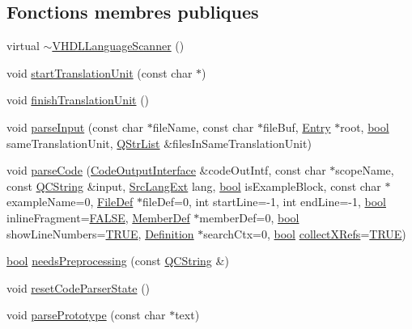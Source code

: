 \subsection*{Fonctions membres publiques}
\begin{DoxyCompactItemize}
\item 
virtual \hyperlink{class_v_h_d_l_language_scanner_a9d7b0728dbc101161107fe0785ae460b}{$\sim$\+V\+H\+D\+L\+Language\+Scanner} ()
\item 
void \hyperlink{class_v_h_d_l_language_scanner_a57e38f82bcb0ab8af7d6dabe131ad394}{start\+Translation\+Unit} (const char $\ast$)
\item 
void \hyperlink{class_v_h_d_l_language_scanner_a1c08cc94a1cd79fdaf8a102935089445}{finish\+Translation\+Unit} ()
\item 
void \hyperlink{class_v_h_d_l_language_scanner_a604cae09257525fbca32c10ffeb6e961}{parse\+Input} (const char $\ast$file\+Name, const char $\ast$file\+Buf, \hyperlink{class_entry}{Entry} $\ast$root, \hyperlink{qglobal_8h_a1062901a7428fdd9c7f180f5e01ea056}{bool} same\+Translation\+Unit, \hyperlink{class_q_str_list}{Q\+Str\+List} \&files\+In\+Same\+Translation\+Unit)
\item 
void \hyperlink{class_v_h_d_l_language_scanner_a50e725c43fa209d4caad04c214bbb1f2}{parse\+Code} (\hyperlink{class_code_output_interface}{Code\+Output\+Interface} \&code\+Out\+Intf, const char $\ast$scope\+Name, const \hyperlink{class_q_c_string}{Q\+C\+String} \&input, \hyperlink{types_8h_a9974623ce72fc23df5d64426b9178bf2}{Src\+Lang\+Ext} lang, \hyperlink{qglobal_8h_a1062901a7428fdd9c7f180f5e01ea056}{bool} is\+Example\+Block, const char $\ast$example\+Name=0, \hyperlink{class_file_def}{File\+Def} $\ast$file\+Def=0, int start\+Line=-\/1, int end\+Line=-\/1, \hyperlink{qglobal_8h_a1062901a7428fdd9c7f180f5e01ea056}{bool} inline\+Fragment=\hyperlink{qglobal_8h_a10e004b6916e78ff4ea8379be80b80cc}{F\+A\+L\+S\+E}, \hyperlink{class_member_def}{Member\+Def} $\ast$member\+Def=0, \hyperlink{qglobal_8h_a1062901a7428fdd9c7f180f5e01ea056}{bool} show\+Line\+Numbers=\hyperlink{qglobal_8h_a04a6422a52070f0dc478693da640242b}{T\+R\+U\+E}, \hyperlink{class_definition}{Definition} $\ast$search\+Ctx=0, \hyperlink{qglobal_8h_a1062901a7428fdd9c7f180f5e01ea056}{bool} \hyperlink{tclscanner_8cpp_ac23b94d6976d5bb0c9f1885c5a2e7a53}{collect\+X\+Refs}=\hyperlink{qglobal_8h_a04a6422a52070f0dc478693da640242b}{T\+R\+U\+E})
\item 
\hyperlink{qglobal_8h_a1062901a7428fdd9c7f180f5e01ea056}{bool} \hyperlink{class_v_h_d_l_language_scanner_ae36ed4aad0a9dc9beed5afa3e831a5ee}{needs\+Preprocessing} (const \hyperlink{class_q_c_string}{Q\+C\+String} \&)
\item 
void \hyperlink{class_v_h_d_l_language_scanner_a67461c7de314e7f414fb70d5735727c3}{reset\+Code\+Parser\+State} ()
\item 
void \hyperlink{class_v_h_d_l_language_scanner_a10bbe28441f011a5de49705e1a64db00}{parse\+Prototype} (const char $\ast$text)
\end{DoxyCompactItemize}


